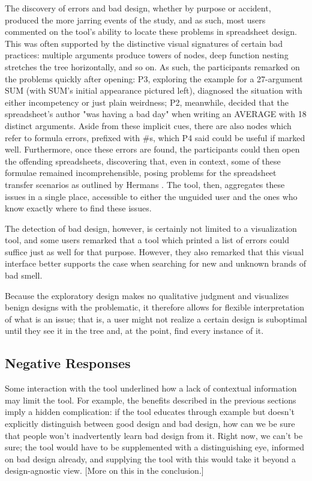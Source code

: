 \documentclass[conference]{IEEEtran}
\begin{document}
	The discovery of errors and bad design, whether by purpose or accident,
	produced the more jarring events of the study, and as such, most users
	commented on the tool's ability to locate these problems in spreadsheet design.
	This was often supported by the distinctive visual signatures of certain bad
	practices: multiple arguments produce towers of nodes, deep function nesting
	stretches the tree horizontally, and so on. As such, the participants remarked
	on the problems quickly after opening: P3, exploring the example for a
	27-argument SUM (with SUM's initial appearance pictured left), diagnosed the
	situation with either incompetency or just plain weirdness; P2, meanwhile,
	decided that the spreadsheet's author "was having a bad day" when writing an
	AVERAGE with 18 distinct arguments. Aside from these implicit cues, there are
	also nodes which refer to formula errors, prefixed with \#s, which P4 said
	could be useful if marked well. Furthermore, once these errors are found, the
	participants could then open the offending spreadsheets, discovering that, even
	in context, some of these formulae remained incomprehensible, posing problems
	for the spreadsheet transfer scenarios as outlined by Hermans
	\cite{hermans2011supporting}. The tool, then, aggregates these issues in a
	single place, accessible to either the unguided user and the ones who know
	exactly where to find these issues. \par
	
	The detection of bad design, however, is certainly not limited to a
	visualization tool, and some users remarked that a tool which printed a list of
	errors could suffice just as well for that purpose. However, they also remarked
	that this visual interface better supports the case when searching for new and
	unknown brands of bad smell.
	
	Because the exploratory design makes no qualitative judgment and visualizes
	benign designs with the problematic, it therefore allows for flexible
	interpretation of what is an issue; that is, a user might not realize a certain
	design is suboptimal until they see it in the tree and, at the point, find
	every instance of it.
	
	\subsection{Negative Responses} Some interaction with the tool underlined how a
	lack of contextual information may limit the tool. For example, the benefits
	described in the previous sections imply a hidden complication: if the tool
	educates through example but doesn't explicitly distinguish between good design
	and bad design, how can we be sure that people won't inadvertently learn bad
	design from it. Right now, we can't be sure; the tool would have to be
	supplemented with a distinguishing eye, informed on bad design already, and
	supplying the tool with this would take it beyond a design-agnostic view. [More
	on this in the conclusion.] \par
	
\end{document}
